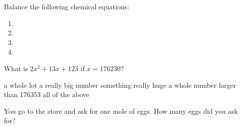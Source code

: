 \documentclass[11pt,addpoints]{exam}   	%
\begin{document}
\begin{questions}
\question
Balance the following chemical equations:
\begin{solution}

\begin{enumerate}
\item {} 

\item {}	

\item {}

\item {}
\end{enumerate}
\end{solution}
\vspace{.2in}

\pagebreak

\question[1] 
What is $2x^2 + 13x + 123$ if $ x = 176230 $?

\begin{choices}
\choice a whole lot
\choice a really big number
\choice something really huge
\choice a whole number larger than 176353
\choice all of the above
\end{choices}
\vspace{.2in}

\question[1]
You go to the store and ask for one mole of eggs. How many eggs did you ask for?
\vspace{.2in}


\end{questions}
\end{document}
